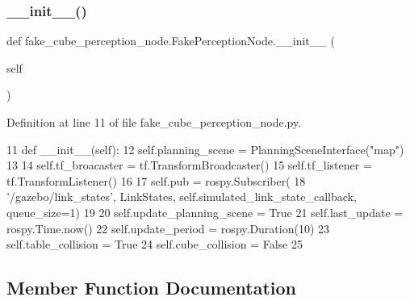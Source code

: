 \subsubsection{\texorpdfstring{\+\_\+\+\_\+init\+\_\+\+\_\+()}{\_\_init\_\_()}}
{\footnotesize\ttfamily def fake\+\_\+cube\+\_\+perception\+\_\+node.\+Fake\+Perception\+Node.\+\_\+\+\_\+init\+\_\+\+\_\+ (\begin{DoxyParamCaption}\item[{}]{self }\end{DoxyParamCaption})}



Definition at line 11 of file fake\+\_\+cube\+\_\+perception\+\_\+node.\+py.


\begin{DoxyCode}
11     \textcolor{keyword}{def }\_\_init\_\_(self):
12         self.planning\_scene = PlanningSceneInterface(\textcolor{stringliteral}{"map"})
13 
14         self.tf\_broacaster = tf.TransformBroadcaster()
15         self.tf\_listener = tf.TransformListener()
16 
17         self.pub = rospy.Subscriber(
18             \textcolor{stringliteral}{'/gazebo/link\_states'}, LinkStates, self.simulated\_link\_state\_callback, queue\_size=1)
19 
20         self.update\_planning\_scene = \textcolor{keyword}{True}
21         self.last\_update = rospy.Time.now()
22         self.update\_period = rospy.Duration(10)
23         self.table\_collision = \textcolor{keyword}{True}
24         self.cube\_collision = \textcolor{keyword}{False}
25 
\end{DoxyCode}


\subsection{Member Function Documentation}
\mbox{\label{classfake__cube__perception__node_1_1FakePerceptionNode_aeac788f768e625ecbe445c6af105d3f8}} 
